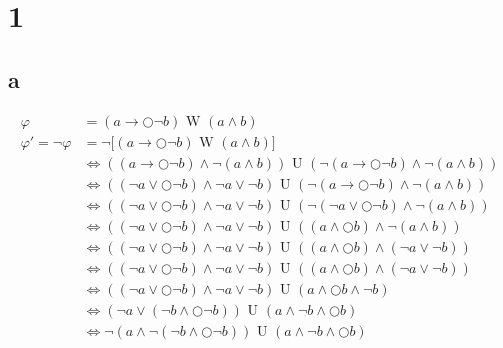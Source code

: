 \documentclass[11pt]{article}
\begin{document}
	
	\section{1}
	\subsection{a}
	\begin{align*}
	\varphi &= (a \rightarrow \bigcirc \lnot b) \text{ W } (a \land b) \\
	\varphi'=\lnot\varphi &= \lnot \big[(a \rightarrow \bigcirc \lnot b) \text{ W } (a \land b) \big]\\
	&\Leftrightarrow ((a\rightarrow \bigcirc\lnot b) \land \lnot(a \land b)) \text{ U } (\lnot(a \rightarrow \bigcirc \lnot b) \land \lnot(a \land b))\\
	&\Leftrightarrow ((\lnot a \lor \bigcirc\lnot b) \land \lnot a \lor \lnot b) \text{ U } (\lnot(a \rightarrow \bigcirc \lnot b) \land \lnot(a \land b)) \\
	&\Leftrightarrow ((\lnot a \lor \bigcirc\lnot b) \land \lnot a \lor \lnot b) \text{ U } (\lnot(\lnot a \lor \bigcirc \lnot b) \land \lnot(a \land b)) \\
	&\Leftrightarrow ((\lnot a \lor \bigcirc\lnot b) \land \lnot a \lor \lnot b) \text{ U } ( (a \land \bigcirc b) \land \lnot(a \land b)) \\
	&\Leftrightarrow ((\lnot a \lor \bigcirc\lnot b)\land \lnot a \lor \lnot b) \text{ U } ( (a \land \bigcirc b) \land (\lnot a \lor \lnot b)) \\
	&\Leftrightarrow ((\lnot a \lor \bigcirc\lnot b)\land \lnot a \lor \lnot b) \text{ U } ( (a \land \bigcirc b) \land (\lnot a \lor \lnot b)) \\
	&\Leftrightarrow ((\lnot a \lor \bigcirc\lnot b)\land \lnot a \lor \lnot b) \text{ U } ( a \land \bigcirc b \land \lnot b) \\
	&\Leftrightarrow (\lnot a \lor (\lnot b \land \bigcirc\lnot b)) \text{ U }(a \land \lnot b \land\bigcirc b) \\
	&\Leftrightarrow \lnot (a \land \lnot(\lnot b \land \bigcirc\lnot b)) \text{ U }(a \land \lnot b \land\bigcirc b) \\
	\end{align*}
	
\end{document}
